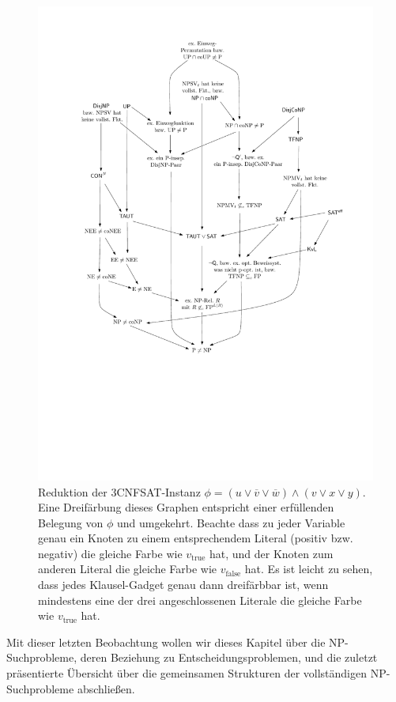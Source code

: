 \begin{figure}[t]
    \centering\includegraphics[page=6]{figures.pdf}
    \caption{Reduktion der 3CNFSAT-Instanz $\phi=(u\lor \overline{v} \lor \overline{w}) \land (v\lor x\lor y)$. 
        Eine Dreifärbung dieses Graphen entspricht einer erfüllenden Belegung von $\phi$ und umgekehrt.
    Beachte dass zu jeder Variable genau ein Knoten zu einem entsprechendem Literal (positiv bzw. negativ) die gleiche Farbe wie $v_{\text{true}}$ hat, und der Knoten zum anderen Literal die gleiche Farbe wie $v_{\text{false}}$ hat. Es ist leicht zu sehen, dass jedes Klausel-Gadget genau dann dreifärbbar ist, wenn mindestens eine der drei angeschlossenen Literale die gleiche Farbe wie $v_{\text{true}}$ hat.}\label{fig:3col}
\end{figure}

Mit dieser letzten Beobachtung wollen wir dieses Kapitel über die NP-Suchprobleme, deren Beziehung zu Entscheidungsproblemen, und die zuletzt präsentierte Übersicht über die gemeinsamen Strukturen der vollständigen NP-Suchprobleme abschließen. 


